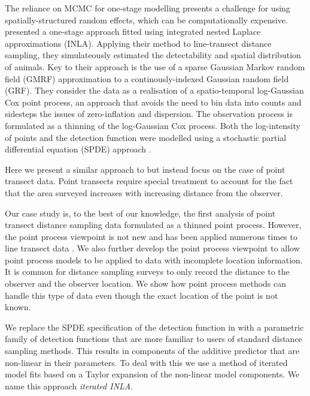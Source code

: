 \documentclass[preprint,12pt]{elsarticle}
\begin{document}
The reliance on MCMC for one-stage modelling presents a challenge for using spatially-structured random effects, which can be computationally expensive.  \citet{yuan_point_2017} presented a one-stage approach fitted using integrated nested Laplace approximations (INLA).  Applying their method to line-transect distance sampling, they simulateously estimated the detectability and spatial distribution of animals.
Key to their approach is the use of a sparse Gaussian Markov random field (GMRF) approximation to a continously-indexed Gaussian random field (GRF).  They consider the data as a realisation of a spatio-temporal log-Gaussian Cox point process, an approach that avoids the need to bin data into counts and sidesteps the issues of zero-inflation and dispersion.  The observation process is formulated as a thinning of the log-Gaussian Cox process.  Both the log-intensity of points and the detection function were modelled using a stochastic partial differential equation (SPDE) approach \citep{lindgren_explicit_2011}.

Here we present a similar approach to \citet{yuan_point_2017} but instead focus on the case of point transect data.  Point transects require special treatment to account for the fact that the area surveyed increases with increasing distance from the observer.  

Our case study is, to the best of our knowledge, the first analysis of point transect distance sampling data formulated as a thinned point process.  However, the point process viewpoint is not new and has been applied numerous times to line transect data \citep{buckland_model-based_2016, johnson_model-based_2010, hedley_spatial_2004, stoyan_remark_1982, hogmander_random_1991}.  We also further develop the point process viewpoint to allow point process models to be applied to data with incomplete location information.  It is common for distance sampling surveys to only record the distance to the observer and the observer location.  We show how point process methods can handle this type of data even though the exact location of the point is not known.

We replace the SPDE specification of the detection function in \cite{yuan_point_2017} with a parametric family of detection functions that are more familiar to users of standard distance sampling methods.  This results in components of the additive predictor that are non-linear in their parameters.  To deal with this we use a method of iterated model fits based on a Taylor expansion of the non-linear model components.  We name this approach \textit{iterated INLA}.  
\end{document}
